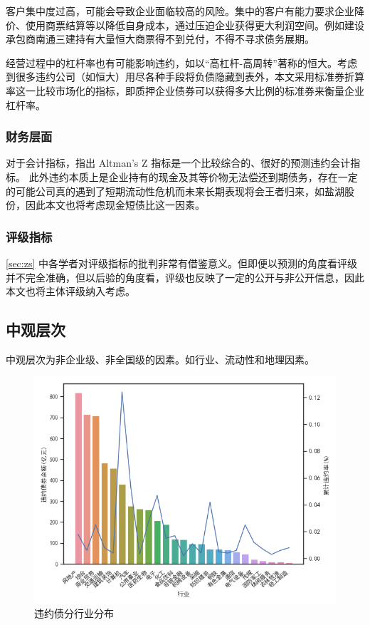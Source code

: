 客户集中度过高，可能会导致企业面临较高的风险\cite{王雄元2017客户集中度与公司债二级市场信用利差}。集中的客户有能力要求企业降价、使用商票结算等以降低自身成本，通过压迫企业获得更大利润空间。例如建设承包商南通三建持有大量恒大商票得不到兑付，不得不寻求债务展期。

经营过程中的杠杆率也有可能影响违约\cite{王永钦2019杠杆率如何影响资产价格}，如以“高杠杆-高周转”著称的恒大。考虑到很多违约公司（如恒大）用尽各种手段将负债隐藏到表外，本文采用标准券折算率这一比较市场化的指标，即质押企业债券可以获得多大比例的标准券来衡量企业杠杆率。
\subsubsection{财务层面}
对于会计指标，\Textcite{blochlinger2018ratings}指出 Altman's Z 指标是一个比较综合的、很好的预测违约会计指标。
此外违约本质上是企业持有的现金及其等价物无法偿还到期债务，存在一定的可能公司真的遇到了短期流动性危机而未来长期表现将会王者归来，如盐湖股份，因此本文也将考虑现金短债比这一因素。
\subsubsection{评级指标}
\ref{sec:zs} 中各学者对评级指标的批判非常有借鉴意义。但即便以预测的角度看评级并不完全准确，但以后验的角度看，评级也反映了一定的公开与非公开信息，因此本文也将主体评级纳入考虑。
\subsection{中观层次}
中观层次为非企业级、非全国级的因素。如行业、流动性和地理因素。

\begin{figure}[h]
	\centering
	\includegraphics[width=.9\linewidth]{./data/industry.png}
	\caption{\label{fig:industry}违约债分行业分布}
\end{figure}

